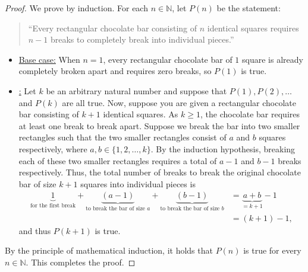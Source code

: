 \documentclass[11pt]{article}
\theoremstyle{plain}
\theoremstyle{plain}
\theoremstyle{remark}
\def\naturals{\mathbb{N}}
\begin{document}
\begin{proof}
 We prove by induction. For each $n\in\naturals$,  let  $P(n)$ be the statement: 
 \begin{quotation}
  \noindent ``Every rectangular chocolate bar consisting of $n$ identical squares requires $n-1$ breaks to completely break into individual pieces.''
 \end{quotation}

 \begin{itemize}
  \item\underline{Base case:} When $n=1$, every rectangular chocolate bar of $1$ square is already completely broken apart and requires zero breaks, so $P(1)$ is true.
\item\underline{:} Let $k$ be an arbitrary natural number and suppose that $P(1),P(2),\dots$ and $P(k)$ are all true. Now, suppose you are given a rectangular chocolate bar consisting of $k+1$ identical squares. As $k\geq1$, the chocolate bar requires at least one break to break apart. Suppose we break the bar into two smaller rectangles such that the two smaller rectangles consist of  $a$ and $b$ squares respectively, where $a,b\in\{1,2,\dots,k\}$. By the induction hypothesis, breaking each of these two smaller rectangles requires a total of $a-1$ and $b-1$ breaks respectively. Thus, the total number of breaks to break the original chocolate bar of size $k+1$ squares into individual pieces is 
\begin{align*}
 \underbrace{1}_{\text{for the first break}} + \underbrace{(a-1)}_{\text{to break the bar of size }a} + \underbrace{(b-1)}_{\text{to break the bar of size }b} &= \underbrace{a+b}_{=k+1} - 1 \\
  &= (k+1)-1,
\end{align*}
and thus $P(k+1)$ is true.
 \end{itemize}
By the principle of mathematical induction, it holds that $P(n)$ is true for every $n\in\naturals$. This completes the proof.
\end{proof}
\end{document}
